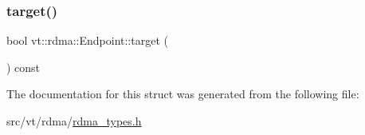 \mbox{\label{structvt_1_1rdma_1_1_endpoint_a6ef942569868488e455a581a8c81a250}} 
\subsubsection{\texorpdfstring{target()}{target()}}
{\footnotesize\ttfamily bool vt\+::rdma\+::\+Endpoint\+::target (\begin{DoxyParamCaption}{ }\end{DoxyParamCaption}) const\hspace{0.3cm}{\ttfamily [inline]}}



The documentation for this struct was generated from the following file\+:\begin{DoxyCompactItemize}
\item 
src/vt/rdma/\hyperlink{rdma__types_8h}{rdma\+\_\+types.\+h}\end{DoxyCompactItemize}
